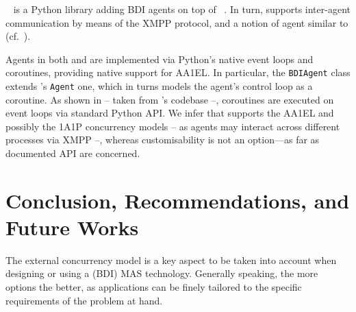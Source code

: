 


\subsubsection{\spadebdi{}}

\spadebdi{}~\cite{PalancaRCJT22} is a Python library adding \ac{BDI} agents on top of \spade{}~\cite{GregoriCB06}.
%
In turn, 
\spade{} supports inter-agent communication by means of the XMPP protocol, 
and a notion of agent similar to \jade{} (cf.~\cite{BellifemineCG07}).


%
Agents in both \spadebdi{} and \spade{} are implemented via Python's native event loops and coroutines,
providing native support for \ac{AA1EL}.
%
In particular, 
the \texttt{BDIAgent} class extends \spade{}'s \texttt{Agent} one, 
which in turns models the agent's control loop as a coroutine.
%
As shown in  
-- taken from \spade{}'s codebase --, 
coroutines are executed on event loops via standard Python \ac{API}.
%
We infer that \spadebdi{} supports the \ac{AA1EL} and possibly the \ac{1A1P} concurrency models 
-- as agents may interact across different processes via XMPP --, 
whereas customisability is not an option---as far as documented \ac{API} are concerned.

\section{Conclusion, Recommendations, and Future Works}\label{sec:discussion}

The external concurrency model is a key aspect to be taken into account when designing or using a (\ac{BDI}) \ac{MAS} technology.
%
Generally speaking,
the more options the better,
as applications can be finely tailored to the specific requirements of the problem at hand.


